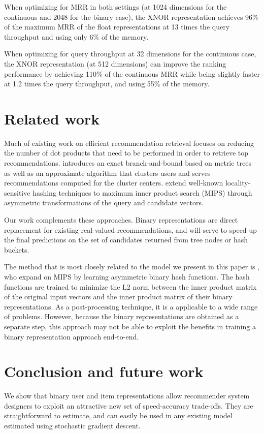 \documentclass[sigchi]{acmart}
\begin{document}
When optimizing for MRR in both settings (at 1024 dimensions for the continuous and 2048 for the binary case), the XNOR representation achieves 96\% of the maximum MRR of the float representations at 13 times the query throughput and using only 6\% of the memory.

When optimizing for query throughput at 32 dimensions for the continuous case, the XNOR representation (at 512 dimensions) can improve the ranking performance by achieving 110\% of the continuous MRR while being slightly faster at 1.2 times the query throughput, and using 55\% of the memory.

\section{Related work}
Much of existing work on efficient recommendation retrieval focuses on reducing the number of dot products that need to be performed in order to retrieve top recommendations. \citet{koenigstein2012efficient} introduces an exact branch-and-bound based on metric trees as well as an approximate algorithm that clusters users and serves recommendations computed for the cluster centers. \citet{shrivastava2014asymmetric} extend well-known \citep{indyk1998approximate} locality-sensitive hashing techniques to maximum inner product search (MIPS) through asymmetric transformations of the query and candidate vectors.

Our work complements these approaches. Binary representations are direct replacement for existing real-valued recommendations, and will serve to speed up the final predictions on the set of candidates returned from tree nodes or hash buckets.

The method that is most closely related to the model we present in this paper is \citet{Shen_2015_ICCV}, who expand on MIPS by learning asymmetric binary hash functions. The hash functions are trained to minimize the L2 norm between the inner product matrix of the original input vectors and the inner product matrix of their binary representations. As a post-processing technique, it is a applicable to a wide range of problems. However, because the binary representations are obtained as a separate step, this approach may not be able to exploit the benefits in training a binary representation approach end-to-end.

\section{Conclusion and future work}
We show that binary user and item representations allow recommender system designers to exploit an attractive new set of speed-accuracy trade-offs. They are straightforward to estimate, and can easily be used in any existing model estimated using stochastic gradient descent.




\end{document}
